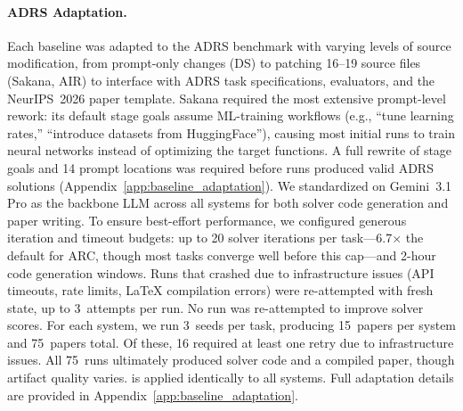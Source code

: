 \paragraph{ADRS Adaptation.}
Each baseline was adapted to the ADRS benchmark with varying levels of source modification, from prompt-only changes (DS) to patching 16--19 source files (Sakana, AIR) to interface with ADRS task specifications, evaluators, and the NeurIPS~2026 paper template.
Sakana required the most extensive prompt-level rework: its default stage goals assume ML-training workflows (e.g., ``tune learning rates,'' ``introduce datasets from HuggingFace''), causing most initial runs to train neural networks instead of optimizing the target functions. A full rewrite of stage goals and 14 prompt locations was required before runs produced valid ADRS solutions (Appendix~\ref{app:baseline_adaptation}).
We standardized on Gemini~3.1 Pro as the backbone LLM across all systems for both solver code generation and paper writing.
To ensure best-effort performance, we configured generous iteration and timeout budgets: up to 20 solver iterations per task---6.7$\times$ the default for ARC, though most tasks converge well before this cap---and 2-hour code generation windows.
Runs that crashed due to infrastructure issues (API timeouts, rate limits, LaTeX compilation errors) were re-attempted with fresh state, up to 3~attempts per run. No run was re-attempted to improve solver scores.
For each system, we run 3~seeds per task, producing 15~papers per system and 75~papers total.
Of these, 16 required at least one retry due to infrastructure issues. All 75~runs ultimately produced solver code and a compiled paper, though artifact quality varies.
\coeaudit{} is applied identically to all systems.
Full adaptation details are provided in Appendix~\ref{app:baseline_adaptation}.
